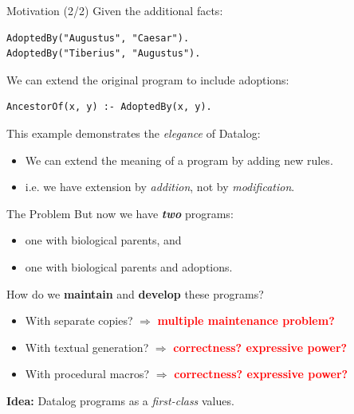 \begin{frame}[fragile]{Motivation (2/2)}
Given the additional facts:

\begin{lstlisting}[language=flix, xleftmargin=0.8cm]
AdoptedBy("Augustus", "Caesar").
AdoptedBy("Tiberius", "Augustus").
\end{lstlisting}

We can extend the original program to include adoptions:

\begin{lstlisting}[language=flix, xleftmargin=0.8cm]
AncestorOf(x, y) :- AdoptedBy(x, y).
\end{lstlisting}

This example demonstrates the \emph{elegance} of Datalog:

\begin{itemize}
    \item We can extend the meaning of a program by adding new rules.
    \item i.e. we have extension by \emph{addition}, not by \emph{modification}.
\end{itemize}
\end{frame}

\begin{frame}{The Problem}
But now we have \textbf{\emph{two}} programs: 

\begin{itemize}
    \item one with biological parents, and
    \item one with biological parents and adoptions.
\end{itemize}

How do we \textbf{maintain} and \textbf{develop} these programs?

\begin{itemize}
    \item With separate copies? $\Rightarrow$ \textcolor{red}{\bfseries multiple maintenance problem?}
    \item With textual generation? $\Rightarrow$ \textcolor{red}{\bfseries correctness? expressive power?}
    \item With procedural macros? $\Rightarrow$ \textcolor{red}{\bfseries correctness? expressive power?}
\end{itemize}

\begin{center}
\large
\textbf{Idea:} Datalog programs as a \emph{first-class} values.
\end{center}
\end{frame}

